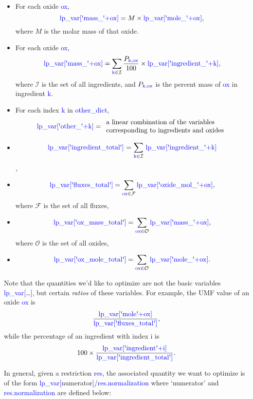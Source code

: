 \documentclass[a4paper,10pt]{article}
\def\'{\textquotesingle}
\def\blue{\textcolor{blue}}
\def\lpv{lp\_var}
\begin{document}
\begin{itemize}
\item For each oxide \blue{ox}, 
$$\textnormal{\blue{\lpv[\'mass\_\'+ox]}} = M\times \blue{\textnormal{\lpv[\'mole\_\'+ox]}},$$
where $M$ is the molar mass of that oxide.
\item For each oxide \blue{ox}, 
$$\textnormal{\blue{\lpv[\'mass\_\'+ox]}} = \sum_{\textnormal{\blue{k}}\in\mathcal{I}} \frac{P_{\textnormal{\blue{k},\blue{ox}}}}{100} \times \textnormal{\blue{\lpv[\'ingredient\_\'+k]}},$$ 
where $\mathcal{I}$ is the set of all ingredients, and $P_{\blue{\textnormal{k}},\blue{\textnormal{ox}}}$ is the percent mass of \blue{ox} in ingredient \blue{k}.
\item For each index \blue{k} in \blue{other\_dict}, 
$$\textnormal{\blue{\lpv[\'other\_\'+k]}} = \begin{array}{l}\textnormal{a linear combination of the variables}\\
\textnormal{corresponding to ingredients and oxides}
\end{array}$$ 
\item $$\textnormal{\blue{\lpv[\'ingredient\_total\']} = $\sum_{\textnormal{\blue{k}}\in\mathcal{I}}$ \blue{\lpv[\'ingredient\_\'+k]}}$$, 
\item $$\textnormal{\blue{\lpv[\'fluxes\_total\']}} = \sum_{\blue{\textnormal{ox}}\in \mathcal{F}} \textnormal{\blue{\lpv[\'oxide\_mol\_\'+ox]}},$$ 
where $\mathcal{F}$ is the set of all fluxes, 
\item $$\textnormal{\blue{\lpv[\'ox\_mass\_total\']}} = \sum_{\blue{\textnormal{ox}}\in \mathcal{O}} \textnormal{\blue{\lpv[\'mass\_\'+ox]}},$$ where $\mathcal{O}$ is the set of all oxides,  
\item $$\textnormal{\blue{\lpv[\'ox\_mole\_total\']}} = \sum_{\blue{\textnormal{ox}}\in \mathcal{O}} \textnormal{\blue{\lpv[\'mole\_\'+ox]}}.$$
\end{itemize}

Note that the quantities we'd like to optimize are not the basic variables \blue{\lpv[}\ldots\blue{]}, but certain \emph{ratios} of these variables. For example, the UMF value of an oxide \blue{ox} is $$\frac{\textnormal{\blue{\lpv[\'mole\'+ox]}}}{\textnormal{\blue{\lpv[\'fluxes\_total\']}}},$$ 
while the percentage of an ingredient with index \blue{i} is $$100\times\frac{\textnormal{\blue{\lpv[\'ingredient\'+i]}}}{\textnormal{\blue{\lpv[\'ingredient\_total\']}}}.$$

In general, given a restriction \blue{res}, the associated quantity we want to optimize is of the form \blue{\lpv[}numerator\blue{]}/\blue{res.normalization} where `numerator' and \blue{res.normalization} are defined below:
\end{document}

